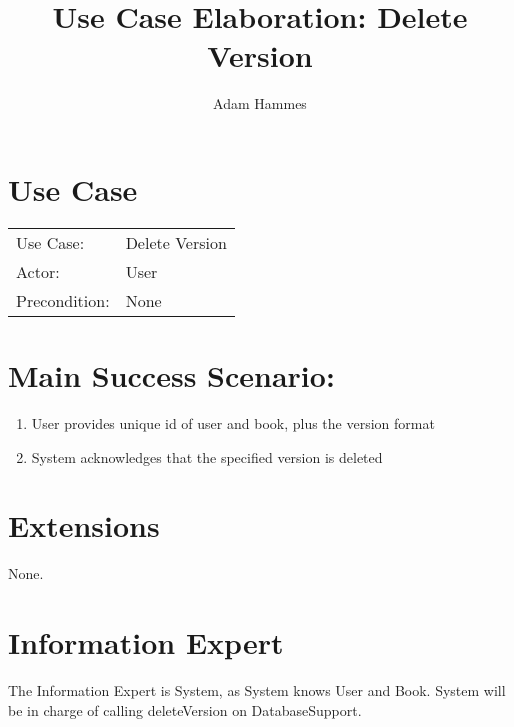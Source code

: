 \documentclass{article}
\title{Use Case Elaboration: Delete Version}
\author{ Adam Hammes }
\begin{document}
\maketitle


\section*{Use Case}
\begin{tabular}{l l}
Use Case:     & Delete Version\\
Actor:        & User\\
Precondition: & None\\
\end{tabular}


\section*{Main Success Scenario:}

\begin{enumerate}
    \item User provides unique id of user and book, plus the version format
    \item System acknowledges that the specified version is deleted

\end{enumerate}

\section*{Extensions}

None.


\section*{Information Expert}

The Information Expert is System, as System knows User and Book.
System will be in charge of calling deleteVersion on DatabaseSupport.
\end{document}
